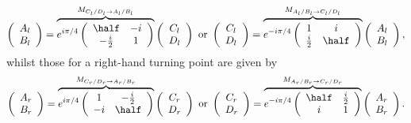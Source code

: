 \documentclass[12pt]{article}
\begin{document}
\begin{equation}
\left( \begin{array}{c}
A_l\\
B_l\\
\end{array} \right)=\overbrace{e^{i\pi/4}
\left( \begin{array}{cc}
\half & -i\\
-\frac{i}{2} & 1\\
\end{array} \right)}^{M_{C_l/D_l\rightarrow A_l/B_l}}
\left( \begin{array}{c}
C_l\\
D_l\\
\end{array} \right)
\mbox{ or }
\left( \begin{array}{c}
C_l\\
D_l\\
\end{array} \right)=\overbrace{e^{-i\pi/4}
\left( \begin{array}{cc}
1 & i\\
\frac{i}{2} & \half\\
\end{array} \right)}^{M_{A_l/B_l\rightarrow C_l/D_l}}
\left( \begin{array}{c}
A_l\\
B_l\\
\end{array} \right),
\label{connection1}
\end{equation}
whilst  those for a right-hand turning point are given by
\begin{equation}
\left( \begin{array}{c}
A_r\\
B_r\\
\end{array} \right)=
\overbrace{e^{i\pi/4}\left( \begin{array}{cc}
1 & -\frac{i}{2}\\
-i & \half\\
\end{array} \right)}^{M_{C_r/D_r\rightarrow A_r/B_r}}
\left( \begin{array}{c}
C_r\\
D_r\\\end{array} \right)
\mbox{ or }
\left( \begin{array}{c}
C_r\\
D_r\\
\end{array} \right)=\overbrace{e^{-i\pi/4}
\left( \begin{array}{cc}
\half & \frac{i}{2}\\
i & 1\\
\end{array} \right)}^{M_{A_r/B_r\rightarrow C_r/D_r}}
\left( \begin{array}{c}
A_r\\
B_r\\
\end{array} \right).
\label{connection2}
\end{equation}
\end{document}
